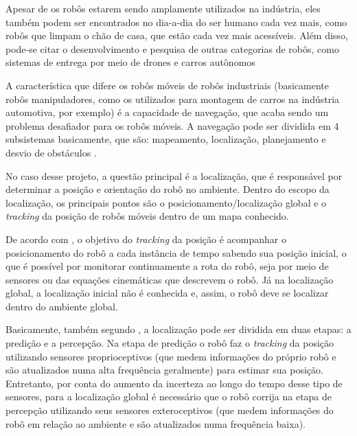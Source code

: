 \documentclass[acronym, symbols, table]{fei}
\begin{document}
	Apesar de os robôs estarem sendo amplamente utilizados na indústria, eles também podem ser encontrados no dia-a-dia do ser humano cada vez mais, como robôs que limpam o chão de casa, que estão cada vez mais acessíveis. Além disso, pode-se citar o desenvolvimento e pesquisa de outras categorias de robôs, como sistemas de entrega por meio de drones \cite{su14010360} e carros autônomos \cite{parekh2022review}
	
	A característica que difere os robôs móveis de robôs industriais (basicamente robôs manipuladores, como os utilizados para montagem de carros na indústria automotiva, por exemplo) é a capacidade de navegação, que acaba sendo um problema desafiador para os robôs móveis. A navegação pode ser dividida em 4 subsistemas basicamente, que são: mapeamento, localização, planejamento e desvio de obstáculos \cite{app12146951}. 
	
	No caso desse projeto, a questão principal é a localização, que é responsável por determinar a posição e orientação do robô no ambiente. Dentro do escopo da localização, os principais pontos são o posicionamento/localização global e o \textit{tracking} da posição de robôs móveis dentro de um mapa conhecido.
	
	De acordo com \textcite{PANIGRAHI20226019}, o objetivo do \textit{tracking} da posição é acompanhar o posicionamento do robô a cada instância de tempo sabendo sua posição inicial, o que é possível por monitorar continuamente a rota do robô, seja por meio de sensores ou das equações cinemáticas que descrevem o robô. Já na localização global, a localização inicial não é conhecida e, assim, o robô deve se localizar dentro do ambiente global.
	
	
	Basicamente, também segundo \textcite{PANIGRAHI20226019}, a localização pode ser dividida em duas etapas: a predição e a percepção. Na etapa de predição o robô faz o \textit{tracking} da posição utilizando sensores proprioceptivos (que medem informações do próprio robô e são atualizados numa alta frequência geralmente) para estimar sua posição. Entretanto, por conta do aumento da incerteza ao longo do tempo desse tipo de sensores, para a localização global é necessário que o robô corrija na etapa de percepção utilizando seus sensores exteroceptivos (que medem informações do robô em relação ao ambiente e são atualizados numa frequência baixa).
	
\end{document}

